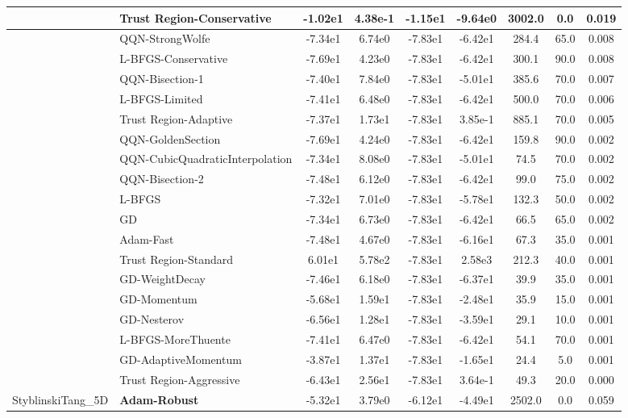 \documentclass{article}
\begin{document}
\begin{longtable}{|l|l|c|c|c|c|c|c|c|}
\hline
 & Trust Region-Conservative & -1.02e1 & 4.38e-1 & -1.15e1 & -9.64e0 & 3002.0 & 0.0 & 0.019 \\
\hline
 & QQN-StrongWolfe & -7.34e1 & 6.74e0 & -7.83e1 & -6.42e1 & 284.4 & 65.0 & 0.008 \\
\hline
 & L-BFGS-Conservative & -7.69e1 & 4.23e0 & -7.83e1 & -6.42e1 & 300.1 & 90.0 & 0.008 \\
\hline
 & QQN-Bisection-1 & -7.40e1 & 7.84e0 & -7.83e1 & -5.01e1 & 385.6 & 70.0 & 0.007 \\
\hline
 & L-BFGS-Limited & -7.41e1 & 6.48e0 & -7.83e1 & -6.42e1 & 500.0 & 70.0 & 0.006 \\
\hline
 & Trust Region-Adaptive & -7.37e1 & 1.73e1 & -7.83e1 & 3.85e-1 & 885.1 & 70.0 & 0.005 \\
\hline
 & QQN-GoldenSection & -7.69e1 & 4.24e0 & -7.83e1 & -6.42e1 & 159.8 & 90.0 & 0.002 \\
\hline
 & QQN-CubicQuadraticInterpolation & -7.34e1 & 8.08e0 & -7.83e1 & -5.01e1 & 74.5 & 70.0 & 0.002 \\
\hline
 & QQN-Bisection-2 & -7.48e1 & 6.12e0 & -7.83e1 & -6.42e1 & 99.0 & 75.0 & 0.002 \\
\hline
 & L-BFGS & -7.32e1 & 7.01e0 & -7.83e1 & -5.78e1 & 132.3 & 50.0 & 0.002 \\
\hline
 & GD & -7.34e1 & 6.73e0 & -7.83e1 & -6.42e1 & 66.5 & 65.0 & 0.002 \\
\hline
 & Adam-Fast & -7.48e1 & 4.67e0 & -7.83e1 & -6.16e1 & 67.3 & 35.0 & 0.001 \\
\hline
 & Trust Region-Standard & 6.01e1 & 5.78e2 & -7.83e1 & 2.58e3 & 212.3 & 40.0 & 0.001 \\
\hline
 & GD-WeightDecay & -7.46e1 & 6.18e0 & -7.83e1 & -6.37e1 & 39.9 & 35.0 & 0.001 \\
\hline
 & GD-Momentum & -5.68e1 & 1.59e1 & -7.83e1 & -2.48e1 & 35.9 & 15.0 & 0.001 \\
\hline
 & GD-Nesterov & -6.56e1 & 1.28e1 & -7.83e1 & -3.59e1 & 29.1 & 10.0 & 0.001 \\
\hline
 & L-BFGS-MoreThuente & -7.41e1 & 6.47e0 & -7.83e1 & -6.42e1 & 54.1 & 70.0 & 0.001 \\
\hline
 & GD-AdaptiveMomentum & -3.87e1 & 1.37e1 & -7.83e1 & -1.65e1 & 24.4 & 5.0 & 0.001 \\
\hline
 & Trust Region-Aggressive & -6.43e1 & 2.56e1 & -7.83e1 & 3.64e-1 & 49.3 & 20.0 & 0.000 \\
StyblinskiTang\_5D & \textbf{Adam-Robust} & -5.32e1 & 3.79e0 & -6.12e1 & -4.49e1 & 2502.0 & 0.0 & 0.059 \\

\end{longtable}
\end{document}
